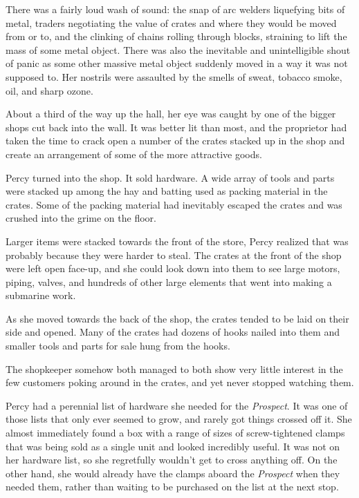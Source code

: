 \documentclass[]{scrbook}
\begin{document}
There was a fairly loud wash of sound: the snap of arc welders
liquefying bits of metal, traders negotiating the value of crates and
where they would be moved from or to, and the clinking of chains rolling
through blocks, straining to lift the mass of some metal object. There
was also the inevitable and unintelligible shout of panic as some other
massive metal object suddenly moved in a way it was not supposed to. Her
nostrils were assaulted by the smells of sweat, tobacco smoke, oil, and
sharp ozone.

About a third of the way up the hall, her eye was caught by one of the
bigger shops cut back into the wall. It was better lit than most, and
the proprietor had taken the time to crack open a number of the crates
stacked up in the shop and create an arrangement of some of the more
attractive goods.

Percy turned into the shop. It sold hardware. A wide array of tools and
parts were stacked up among the hay and batting used as packing material
in the crates. Some of the packing material had inevitably escaped the
crates and was crushed into the grime on the floor.

Larger items were stacked towards the front of the store, Percy realized
that was probably because they were harder to steal. The crates at the
front of the shop were left open face-up, and she could look down into
them to see large motors, piping, valves, and hundreds of other large
elements that went into making a submarine work.

As she moved towards the back of the shop, the crates tended to be laid
on their side and opened. Many of the crates had dozens of hooks nailed
into them and smaller tools and parts for sale hung from the hooks.

The shopkeeper somehow both managed to both show very little interest in
the few customers poking around in the crates, and yet never stopped
watching them.

Percy had a perennial list of hardware she needed for the
\emph{Prospect}. It was one of those lists that only ever seemed to
grow, and rarely got things crossed off it. She almost immediately found
a box with a range of sizes of screw-tightened clamps that was being
sold as a single unit and looked incredibly useful. It was not on her
hardware list, so she regretfully wouldn't get to cross anything off. On
the other hand, she would already have the clamps aboard the
\emph{Prospect} when they needed them, rather than waiting to be
purchased on the list at the next stop.
\end{document}

